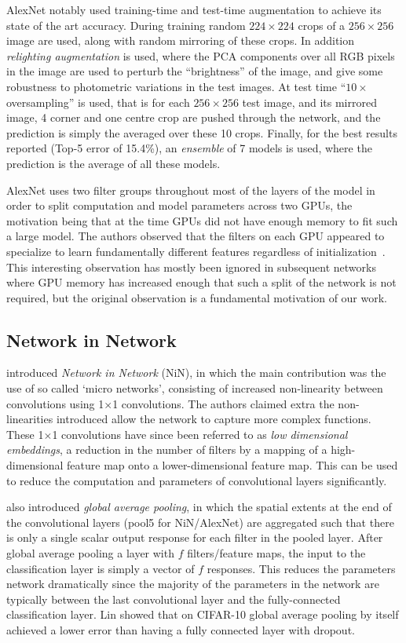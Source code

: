 \documentclass[thesis]{subfiles}
\begin{document}
AlexNet notably used training-time and test-time augmentation to achieve its state of the art accuracy. During training random $224 \times 224$ crops of a $256 \times 256$ image are used, along with random mirroring of these crops. In addition \emph{relighting augmentation} is used, where the PCA components over all RGB pixels in the image are used to perturb the ``brightness'' of the image, and give some robustness to photometric variations in the test images. At test time ``$10\times$ oversampling'' is used, that is for each $256\times 256$ test image, and its mirrored image, 4 corner and one centre crop are pushed through the network, and the prediction is simply the averaged over these 10 crops. Finally, for the best results reported (Top-5 error of 15.4\%), an \emph{ensemble} of 7 models is used, where the prediction is the average of all these models. 

AlexNet uses two filter groups throughout most of the layers of the model in order to split computation and model parameters across two GPUs, the motivation being that at the time GPUs did not have enough memory to fit such a large model. The authors observed that the filters on each GPU appeared to specialize to learn fundamentally different features regardless of initialization~\citep{Krizhevsky2012}. This interesting observation has mostly been ignored in subsequent networks where GPU memory has increased enough that such a split of the network is not required, but the original observation is a fundamental motivation of our work.

\subsection{Network in Network}
\citet{Lin2013NiN} introduced \emph{Network in Network} (NiN), in which the main contribution was the use of so called `micro networks', consisting of increased non-linearity between convolutions using 1$\times$1 convolutions. The authors claimed extra the non-linearities introduced allow the network to capture more complex functions. These 1$\times $1 convolutions have since been referred to as \emph{low dimensional embeddings}, \ie a reduction in the number of filters by a mapping of a high-dimensional feature map onto a lower-dimensional feature map. This can be used to reduce the computation and parameters of convolutional layers significantly. 

\citet{Lin2013NiN} also introduced \emph{global average pooling}, in which the spatial extents at the end of the convolutional layers (\ie pool5 for NiN/AlexNet) are aggregated such that there is only a single scalar output response for each filter in the pooled layer. After global average pooling a layer with $f$ filters/feature maps, the input to the classification layer is simply a vector of $f$ responses. This reduces the parameters network dramatically since the majority of the parameters in the network are typically between the last convolutional layer and the fully-connected classification layer. Lin \etal showed that on CIFAR-10 global average pooling by itself achieved a lower error than having a fully connected layer with dropout.
\end{document}

